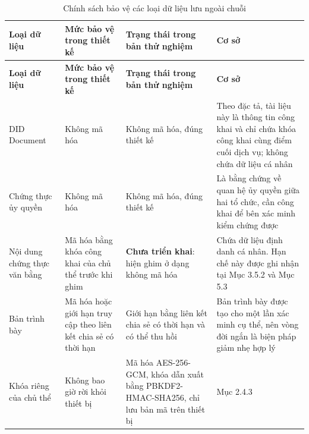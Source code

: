 \begin{longtable}{|p{3.2cm}|p{2.6cm}|p{3.1cm}|p{4.5cm}|}
\caption{Chính sách bảo vệ các loại dữ liệu lưu ngoài chuỗi}
\label{tab:encryption-policy}
\\
\hline
\textbf{Loại dữ liệu} & \textbf{Mức bảo vệ trong thiết kế} & \textbf{Trạng thái trong bản thử nghiệm} & \textbf{Cơ sở} \\
\hline
\endfirsthead

\hline
\textbf{Loại dữ liệu} & \textbf{Mức bảo vệ trong thiết kế} & \textbf{Trạng thái trong bản thử nghiệm} & \textbf{Cơ sở} \\
\hline
\endhead

\hline
\endfoot

\hline
\endlastfoot

DID Document
& Không mã hóa
& Không mã hóa, đúng thiết kế
& Theo đặc tả, tài liệu này là thông tin công khai và chỉ chứa khóa công khai cùng điểm cuối dịch vụ; không chứa dữ liệu cá nhân
\\ \hline

Chứng thực ủy quyền
& Không mã hóa
& Không mã hóa, đúng thiết kế
& Là bằng chứng về quan hệ ủy quyền giữa hai tổ chức, cần công khai để bên xác minh kiểm chứng được
\\ \hline

Nội dung chứng thực văn bằng
& Mã hóa bằng khóa công khai của chủ thể trước khi ghim
& \textbf{Chưa triển khai}: hiện ghim ở dạng không mã hóa
& Chứa dữ liệu định danh cá nhân. Hạn chế này được ghi nhận tại Mục 3.5.2 và Mục 5.3
\\ \hline

Bản trình bày
& Mã hóa hoặc giới hạn truy cập theo liên kết chia sẻ có thời hạn
& Giới hạn bằng liên kết chia sẻ có thời hạn và có thể thu hồi
& Bản trình bày được tạo cho một lần xác minh cụ thể, nên vòng đời ngắn là biện pháp giảm nhẹ hợp lý
\\ \hline

Khóa riêng của chủ thể
& Không bao giờ rời khỏi thiết bị
& Mã hóa AES-256-GCM, khóa dẫn xuất bằng PBKDF2-HMAC-SHA256, chỉ lưu bản mã trên thiết bị
& Mục 2.4.3
\\ \hline

\end{longtable}
